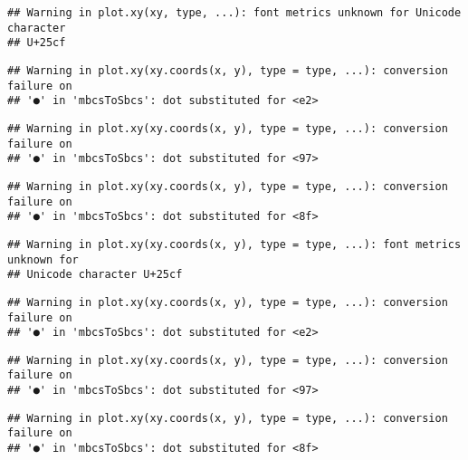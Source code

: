 \documentclass[
]{article}
\newenvironment{Shaded}{\begin{snugshade}}{\end{snugshade}}
\newcommand{\AttributeTok}[1]{\textcolor[rgb]{0.77,0.63,0.00}{#1}}
\newcommand{\FunctionTok}[1]{\textcolor[rgb]{0.00,0.00,0.00}{#1}}
\newcommand{\NormalTok}[1]{#1}
\newcommand{\SpecialCharTok}[1]{\textcolor[rgb]{0.00,0.00,0.00}{#1}}
\newcommand{\StringTok}[1]{\textcolor[rgb]{0.31,0.60,0.02}{#1}}
\begin{document}
\begin{verbatim}
## Warning in plot.xy(xy, type, ...): font metrics unknown for Unicode character
## U+25cf
\end{verbatim}

\begin{Shaded}
\end{Shaded}

\begin{verbatim}
## Warning in plot.xy(xy.coords(x, y), type = type, ...): conversion failure on
## '●' in 'mbcsToSbcs': dot substituted for <e2>
\end{verbatim}

\begin{verbatim}
## Warning in plot.xy(xy.coords(x, y), type = type, ...): conversion failure on
## '●' in 'mbcsToSbcs': dot substituted for <97>
\end{verbatim}

\begin{verbatim}
## Warning in plot.xy(xy.coords(x, y), type = type, ...): conversion failure on
## '●' in 'mbcsToSbcs': dot substituted for <8f>
\end{verbatim}

\begin{verbatim}
## Warning in plot.xy(xy.coords(x, y), type = type, ...): font metrics unknown for
## Unicode character U+25cf
\end{verbatim}

\begin{verbatim}
## Warning in plot.xy(xy.coords(x, y), type = type, ...): conversion failure on
## '●' in 'mbcsToSbcs': dot substituted for <e2>
\end{verbatim}

\begin{verbatim}
## Warning in plot.xy(xy.coords(x, y), type = type, ...): conversion failure on
## '●' in 'mbcsToSbcs': dot substituted for <97>
\end{verbatim}

\begin{verbatim}
## Warning in plot.xy(xy.coords(x, y), type = type, ...): conversion failure on
## '●' in 'mbcsToSbcs': dot substituted for <8f>
\end{verbatim}
\end{document}
